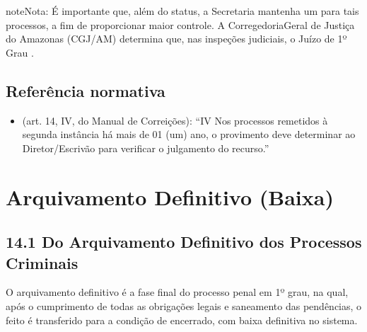 \documentclass[letterpaper,10pt,brazil]{sphinxmanual}
\begin{document}
\begin{sphinxadmonition}{note}{Nota:}
\sphinxAtStartPar
É importante que, além do status, a Secretaria mantenha um  para tais processos, a fim de proporcionar maior controle.
A Corregedoria\sphinxhyphen{}Geral de Justiça do Amazonas (CGJ/AM) determina que, nas inspeções judiciais, o Juízo de 1º Grau .
\end{sphinxadmonition}


\subsection{Referência normativa}
\label{\detokenize{12encaminhar_segundo_grau:referencia-normativa}}\begin{itemize}
\item {} 
\sphinxAtStartPar
{} (art. 14, IV, do Manual de Correições):
“IV \textendash{} Nos processos remetidos à segunda instância há mais de 01 (um) ano, o provimento deve determinar ao Diretor/Escrivão para verificar o julgamento do recurso.”

\end{itemize}

\sphinxstepscope


\section{Arquivamento Definitivo (Baixa)}
\label{\detokenize{13baixa definitiva:arquivamento-definitivo-baixa}}\label{\detokenize{13baixa definitiva::doc}}

\subsection{14.1 \textendash{} Do Arquivamento Definitivo dos Processos Criminais}
\label{\detokenize{13baixa definitiva:do-arquivamento-definitivo-dos-processos-criminais}}
\sphinxAtStartPar
O arquivamento definitivo é a fase final do processo penal em 1º grau, na qual, após o cumprimento de todas as obrigações legais e saneamento das pendências, o feito é transferido para a condição de encerrado, com baixa definitiva no sistema.
\end{document}
